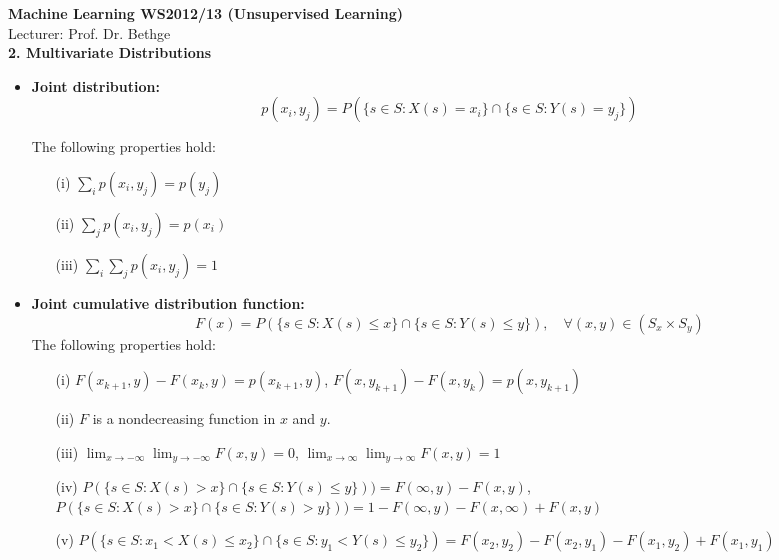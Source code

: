 \documentclass[11pt]{article}
\begin{document}
\begin{center}
{\LARGE\bf  
Machine Learning WS2012/13 (Unsupervised Learning)}\\[.5cm]
{\Large Lecturer: Prof. Dr. Bethge\\[1cm]

\bf 2. Multivariate Distributions
}
\end{center}


\begin{itemize}

\item {\bf Joint distribution:} 
$$
p(x_i, y_j) = P(\{s \in S: X(s) = x_i\} \cap \{s \in S: Y(s) = y_j\})
$$

The following properties hold:
\begin{itemize}
\item[(i)] $\sum_i p(x_i, y_j) = p(y_j)$
\item[(ii)]  $\sum_j p(x_i, y_j) = p(x_i)$
\item[(iii)]  $\sum_i \sum_j p(x_i, y_j) = 1$\\
\end{itemize}

\item {\bf Joint cumulative distribution function:} 
$$
F(x) = P(\{s \in S: X(s) \le x\} \cap \{s \in S: Y(s) \le y\}), \quad \forall (x,y) \in (S_x \times S_y)
$$
The following properties hold:
\begin{itemize}
\item[(i)] $F(x_{k+1},y) - F(x_k,y) = p(x_{k+1},y)$,   \quad $F(x,y_{k+1}) - F(x,y_k) = p(x,y_{k+1})$
\item[(ii)] $F$ is a nondecreasing function in $x$ and $y$.
\item[(iii)] $\lim_{x\to -\infty} \lim_{y\to -\infty}  F(x,y)= 0$, \quad $\lim_{x\to \infty} \lim_{y\to \infty}  F(x,y)= 1$
\item[(iv)] $ P(\{s \in S: X(s) > x\} \cap \{s \in S: Y(s) \le y\})) = F(\infty,y)-F(x,y)$, \\ $ P(\{s \in S: X(s) > x\} \cap \{s \in S: Y(s) > y\})) = 1-F(\infty,y)-F(x,\infty)+F(x,y)$
\item[(v)] $ P(\{s \in S: x_1 < X(s) \le x_2\} \cap \{s \in S: y_1 < Y(s) \le y_2\}) = F(x_2,y_2) - F(x_2,y_1)-F(x_1,y_2) + F(x_1,y_1)$
\end{itemize}


\end{itemize}
\end{document}
